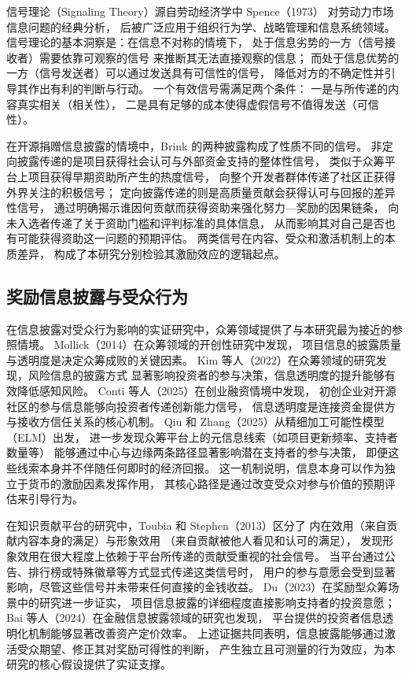 \documentclass[
    type = master, %
    degree = professional,        %
    decl-page,  %
    twoside,                %
    fontset = fandol %
  ]{njuthesis}
\begin{document}
信号理论（Signaling Theory）源自劳动经济学中 Spence（1973）
对劳动力市场信息问题的经典分析\cite{spence1973job}，
后被广泛应用于组织行为学、战略管理和信息系统领域。
信号理论的基本洞察是：在信息不对称的情境下，
处于信息劣势的一方（信号接收者）需要依靠可观察的信号
来推断其无法直接观察的信息；
而处于信息优势的一方（信号发送者）可以通过发送具有可信性的信号，
降低对方的不确定性并引导其作出有利的判断与行动。
一个有效信号需满足两个条件：
一是与所传递的内容真实相关（相关性），
二是具有足够的成本使得虚假信号不值得发送（可信性）\cite{connelly2011signaling}。

在开源捐赠信息披露的情境中，Brink 的两种披露构成了性质不同的信号。
非定向披露传递的是项目获得社会认可与外部资金支持的整体性信号，
类似于众筹平台上项目获得早期资助所产生的热度信号，
向整个开发者群体传递了社区正获得外界关注的积极信号；
定向披露传递的则是高质量贡献会获得认可与回报的差异性信号，
通过明确揭示谁因何贡献而获得资助来强化努力—奖励的因果链条，
向未入选者传递了关于资助门槛和评判标准的具体信息，
从而影响其对自己是否也有可能获得资助这一问题的预期评估。
两类信号在内容、受众和激活机制上的本质差异，
构成了本研究分别检验其激励效应的逻辑起点。

\subsection{奖励信息披露与受众行为}

在信息披露对受众行为影响的实证研究中，众筹领域提供了与本研究最为接近的参照情境。
Mollick（2014）在众筹领域的开创性研究中发现，
项目信息的披露质量与透明度是决定众筹成败的关键因素\cite{mollick2014dynamics}。
Kim 等人（2022）在众筹领域的研究发现，风险信息的披露方式
显著影响投资者的参与决策，信息透明度的提升能够有效降低感知风险\cite{kim2022risk}。
Conti 等人（2025）在创业融资情境中发现，
初创企业对开源社区的参与信息能够向投资者传递创新能力信号，
信息透明度是连接资金提供方与接收方信任关系的核心机制\cite{conti2025beefing}。
Qiu 和 Zhang（2025）从精细加工可能性模型（ELM）出发，
进一步发现众筹平台上的元信息线索（如项目更新频率、支持者数量等）
能够通过中心与边缘两条路径显著影响潜在支持者的参与决策，
即便这些线索本身并不伴随任何即时的经济回报\cite{qiu2025crowdfunding}。
这一机制说明，信息本身可以作为独立于货币的激励因素发挥作用，
其核心路径是通过改变受众对参与价值的预期评估来引导行为。

在知识贡献平台的研究中，Toubia 和 Stephen（2013）区分了
内在效用（来自贡献内容本身的满足）与形象效用
（来自贡献被他人看见和认可的满足），
发现形象效用在很大程度上依赖于平台所传递的贡献受重视的社会信号\cite{benabou2003intrinsic}。
当平台通过公告、排行榜或特殊徽章等方式显式传递这类信号时，
用户的参与意愿会受到显著影响，尽管这些信号并未带来任何直接的金钱收益。
Du（2023）在奖励型众筹场景中的研究进一步证实，
项目信息披露的详细程度直接影响支持者的投资意愿\cite{du2023impact}；
Bai 等人（2024）在金融信息披露领域的研究也发现，
平台提供的投资者信息透明化机制能够显著改善资产定价效率\cite{bai2024platform}。
上述证据共同表明，信息披露能够通过激活受众期望、修正其对奖励可得性的判断，
产生独立且可测量的行为效应，为本研究的核心假设提供了实证支撑。
\end{document}
